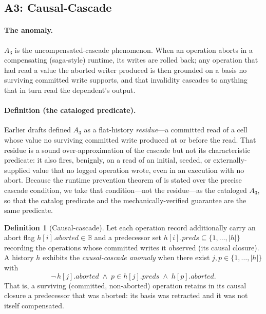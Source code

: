 \documentclass[journal,compsoc,10pt]{IEEEtran}
\theoremstyle{definition}
\newtheorem{anomaly}{Definition}
\theoremstyle{remark}
\newcommand{\fld}[1]{\mathit{#1}}
\begin{document}
\subsection{A3: Causal-Cascade}
\label{sec:a3}
\paragraph{The anomaly.}
$A_3$ is the uncompensated-cascade phenomenon. When an operation aborts in
a compensating (saga-style) runtime, its writes are rolled back; any
operation that had read a value the aborted writer produced is then
grounded on a basis no surviving committed write supports, and that
invalidity cascades to anything that in turn read the dependent's output.

\paragraph{Definition (the cataloged predicate).}
Earlier drafts defined $A_3$ as a flat-history \emph{residue}---a committed
read of a cell whose value no surviving committed write produced at or
before the read. That residue is a sound over-approximation of the cascade
but not its characteristic predicate: it also fires, benignly, on a read of
an initial, seeded, or externally-supplied value that no logged operation
wrote, even in an execution with no abort. Because the runtime prevention
theorem of  is stated over the precise cascade
condition, we take that condition---not the residue---as the cataloged
$A_3$, so that the catalog predicate and the mechanically-verified
guarantee are the same predicate.
\begin{anomaly}[Causal-cascade]
\label{def:a3}
Let each operation record additionally carry an abort flag
$h[i].\fld{aborted} \in \mathbb{B}$ and a predecessor set
$h[i].\fld{preds} \subseteq \{1,\ldots,|h|\}$ recording the operations
whose committed writes it observed (its causal closure). A history $h$
exhibits the \emph{causal-cascade anomaly} when there exist
$j, p \in \{1,\ldots,|h|\}$ with
\[
  \neg\, h[j].\fld{aborted} \;\wedge\; p \in h[j].\fld{preds}
  \;\wedge\; h[p].\fld{aborted}.
\]
That is, a surviving (committed, non-aborted) operation retains in its
causal closure a predecessor that was aborted: its basis was retracted and
it was not itself compensated.
\end{anomaly}
\end{document}
